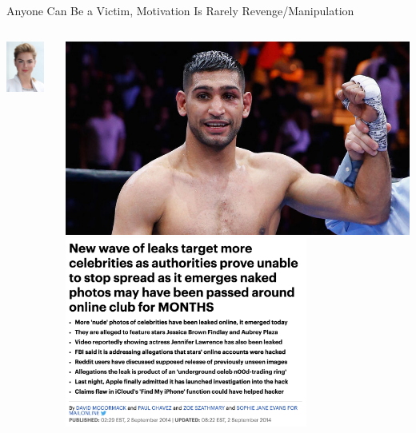\documentclass[nobackground,dvipsnames,table,aspectratio=169]{beamer}
\begin{document}
\begin{frame}{Anyone Can Be a Victim, Motivation Is Rarely Revenge/Manipulation}
\begin{columns}
\begin{columns}
                    \includegraphics[width=0.9\textwidth]{kate-upton}
            \end{columns}
            \includegraphics[width=\textwidth]{amir-khan}
            \centering
            \includegraphics[width=0.7\textwidth]{celebrity-ncii-leaks}

\end{columns}
\end{frame}
\end{document}
